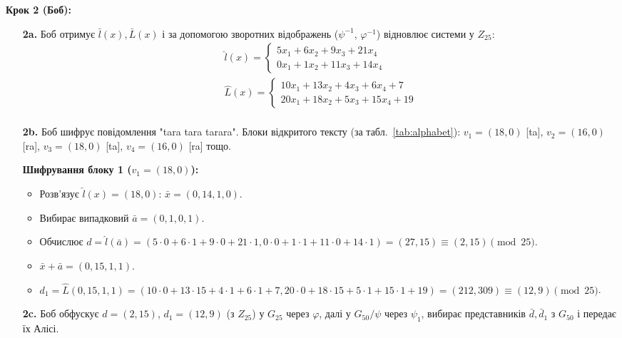 \textbf{Крок 2 (Боб):}
\begin{itemize}
    \item[\textbf{2a.}] Боб отримує $\bar{l}(x), \bar{L}(x)$ і за допомогою зворотних відображень ($\psi^{-1}$, $\varphi^{-1}$) відновлює системи у $Z_{25}$:
    \begin{gather*}
        \hat{l}(x) = \begin{cases}
                         5x_1 + 6x_2 + 9x_3 + 21x_4 \\ 0x_1 + 1x_2 + 11x_3 + 14x_4
        \end{cases}\\
        \hat{L}(x) = \begin{cases}
                         10x_1 + 13x_2 + 4x_3 + 6x_4 + 7 \\ 20x_1 + 18x_2 + 5x_3 + 15x_4 + 19
        \end{cases}\\
    \end{gather*}
    \item[\textbf{2b.}] Боб шифрує повідомлення "tara tara tarara".
    Блоки відкритого тексту (за табл.~\ref{tab:alphabet}): $v_1=(18,0)$ [ta], $v_2=(16,0)$ [ra], $v_3=(18,0)$ [ta], $v_4=(16,0)$ [ra] тощо.

    \textbf{Шифрування блоку 1 ($v_1=(18,0)$):}
    \begin{itemize}
        \item Розв'язує $\hat{l}(x) = (18, 0)$: $\bar{x} = (0, 14, 1, 0)$.
        \item Вибирає випадковий $\bar{a} = (0, 1, 0, 1)$.
        \item Обчислює $d = \hat{l}(\bar{a}) = (5 \cdot 0 + 6 \cdot 1 + 9 \cdot 0 + 21 \cdot 1, 0 \cdot 0 + 1 \cdot 1 + 11 \cdot 0 + 14 \cdot 1) = (27, 15) \equiv (2, 15) \pmod{25}$.
        \item $\bar{x} + \bar{a} = (0, 15, 1, 1)$.
        \item $d_1 = \hat{L}(0, 15, 1, 1) = (10 \cdot 0 + 13 \cdot 15 + 4 \cdot 1 + 6 \cdot 1 + 7, 20 \cdot 0 + 18 \cdot 15 + 5 \cdot 1 + 15 \cdot 1 + 19) = (212, 309) \equiv (12, 9) \pmod{25}$.
    \end{itemize}
    \item[\textbf{2c.}] Боб обфускує $d=(2,15)$, $d_1=(12,9)$ (з $Z_{25}$) у $G_{25}$ через $\varphi$, далі у $G_{50}/\psi$ через $\psi_1$, вибирає представників $\bar{d}, \bar{d}_1$ з $G_{50}$ і передає їх Алісі.
\end{itemize}

